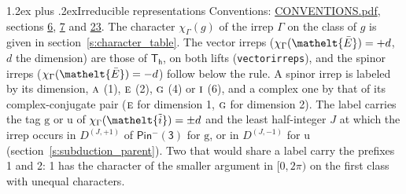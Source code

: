 \documentclass[10pt,a4paper]{article}
\makeatletter
\renewcommand\section{\@startsection{section}{1}{\z@}{-3ex plus -1ex minus -.2ex}%
  {1.2ex plus .2ex}{\normalfont\large\sffamily\bfseries\color{parttitle}}}
\numberwithin{equation}{section}
\newcommand{\eltfont}[1]{{\let\sigma\eltsigma\mathelt{#1}}}
\newcommand{\grp}[1]{\mathsf{#1}}
\newcommand{\irr}[1]{\text{\normalfont\scshape #1}}
\newcommand{\elt}[1]{\eltfont{#1}}
\newcommand{\ptag}[1]{\mathrm{#1}}
\newcommand{\irrJp}[2]{D^{(#1,#2)}}
\newcommand{\irchar}[1]{\chi_{#1}}
\newcommand{\barred}[1]{\bar{#1}}
\newcommand{\lift}[1]{\tilde{#1}}
\makeatother
\begin{document}
\section{Irreducible representations}\label{s:irreps}
Conventions: \href{../../CONVENTIONS.pdf}{CONVENTIONS.pdf}, sections \href{../../../rotation/CONVENTIONS.pdf\#conv.6}{6}, \href{../../../rotation/CONVENTIONS.pdf\#conv.7}{7} and \href{../../CONVENTIONS.pdf\#conv.23}{23}.
\leavevmode\label{n:function.character}\label{n:irrep.Gamma}The character $\irchar{\Gamma}(g)$ of the irrep $\Gamma$ on the class of $g$ is given in section~\ref{s:character_table}. \label{n:index.dimension}The vector irreps ($\irchar{\Gamma}(\elt{\barred{E}}) = +d$, $d$ the dimension) are those of \href{../../../rotation/data/pdf/Th.pdf}{$\grp{T_{h}}$}, on both lifts (\texttt{vectorirreps}), and the spinor irreps ($\irchar{\Gamma}(\elt{\barred{E}}) = -d$) follow below the rule. A spinor irrep is labeled by its dimension, $\irr{a}$ (1), $\irr{e}$ (2), $\irr{g}$ (4) or $\irr{i}$ (6), and a complex one by that of its complex-conjugate pair ($\irr{e}$ for dimension 1, $\irr{g}$ for dimension 2). The label carries the tag $\ptag{g}$ or $\ptag{u}$ of $\irchar{\Gamma}(\elt{\lift{i}}) = \pm d$ and the least half-integer $J$ at which the irrep occurs in $\irrJp{J}{+1}$ of $\grp{Pin^{-}(3)}$ for $\ptag{g}$, or in $\irrJp{J}{-1}$ for $\ptag{u}$ (section~\ref{s:subduction_parent}). Two that would share a label carry the prefixes 1 and 2: 1 has the character of the smaller argument in $[0, 2\pi)$ on the first class with unequal characters.
\end{document}
